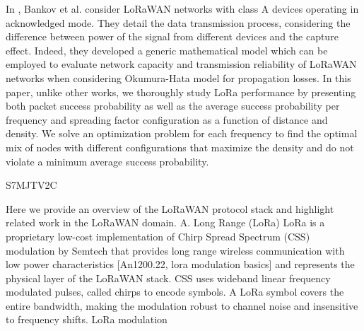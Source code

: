 In \cite{bankov_mathematical_2017},
	Bankov et al.
consider LoRaWAN networks with class A devices operating in acknowledged mode.
They detail the data transmission process,
	considering the difference between power of the signal from different devices and the capture effect.
Indeed,
	they developed a generic mathematical model which can be employed to evaluate network capacity and transmission reliability of LoRaWAN networks when considering Okumura-Hata model for propagation losses.
In this paper,
	unlike other works,
	we thoroughly study LoRa performance by presenting both packet success probability as well as the average success probability per frequency and spreading factor configuration as a function of distance and density.
We solve an optimization problem for each frequency to find the optimal mix of nodes with different configurations that maximize the density and do not violate a minimum average success probability.

\cite{abdelfadeel_fair_2018} S7MJTV2C

Here we provide an overview of the LoRaWAN protocol stack and highlight related work in the LoRaWAN domain.
A.
Long Range (LoRa) LoRa is a proprietary low-cost implementation of Chirp Spread Spectrum (CSS) modulation by Semtech that provides long range wireless communication with low power characteristics [An1200.22,
	lora modulation basics] and represents the physical layer of the LoRaWAN stack.
CSS uses wideband linear frequency modulated pulses,
	called chirps to encode symbols.
A LoRa symbol covers the entire bandwidth,
	making the modulation robust to channel noise and insensitive to frequency shifts.
LoRa modulation

